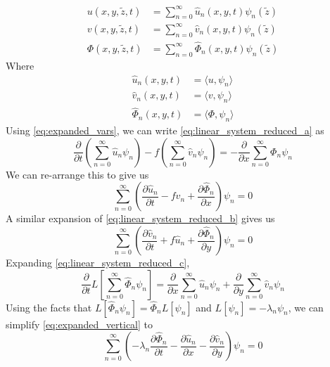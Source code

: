 \documentclass{article}
\numberwithin{equation}{section}
\newcommand{\z}{\tilde{z}}
\begin{document}
\begin{subequations}
  \label{eq:expanded_vars}
  \begin{align}
u(x,y,\z,t) &= \sum_{n=0}^\infty \hat{u}_n(x,y,t)\psi_n({\z}) \\
v(x,y,\z,t) &= \sum_{n=0}^\infty \hat{v}_n(x,y,t)\psi_n({\z}) \\
\Phi(x,y,\z,t) &= \sum_{n=0}^\infty \hat{\Phi}_n(x,y,t)\psi_n({\z})
\end{align}
\end{subequations}
Where 
\begin{subequations}
  \label{eq:expansion_coeffs}
\begin{align}
\hat{u}_n(x,y,t) &= \langle u, \psi_n\rangle \\
\hat{v}_n(x,y,t) &= \langle v, \psi_n\rangle \\
\hat{\Phi}_n(x,y,t) &= \langle \Phi, \psi_n\rangle
\end{align}
\end{subequations}
Using \eqref{eq:expanded_vars}, we can write \eqref{eq:linear_system_reduced_a} as 
\begin{equation}
  \frac{\partial}{\partial t}\left(\sum_{n=0}^\infty \hat{u}_n\psi_n\right) - f\left(\sum_{n=0}^\infty \hat{v}_n\psi_n\right) = -\frac{\partial}{\partial x}\sum_{n=0}^\infty\Phi_n\psi_n
\end{equation}
We can re-arrange this to give us
\begin{equation}
  \label{eq:expanded_u}
  \sum_{n=0}^\infty\left(\frac{\partial \hat{u}_n}{\partial t} - f\hat{v}_n +\frac{\partial\hat{\Phi}_n}{\partial x}\right)\psi_n=0
\end{equation}
A similar expansion of \eqref{eq:linear_system_reduced_b} gives us
\begin{equation}
    \label{eq:expanded_v}
  \sum_{n=0}^\infty\left(\frac{\partial \hat{v}_n}{\partial t} + f\hat{u}_n +\frac{\partial\hat{\Phi}_n}{\partial y}\right)\psi_n=0
\end{equation}
Expanding \eqref{eq:linear_system_reduced_c}, 
\begin{equation}
  \label{eq:expanded_vertical}
  \frac{\partial}{\partial t}L\left[\sum_{n=0}^\infty\hat\Phi_n\psi_n \right] = \frac{\partial}{\partial x}\sum_{n=0}^\infty\hat{u}_n\psi_n + \frac{\partial}{\partial y}\sum_{n=0}^\infty\hat{v}_n\psi_n
\end{equation}
Using the facts that $L[\hat\Phi_n\psi_n]=\hat\Phi_nL[\psi_n]$ and $L[\psi_n]=-\lambda_n\psi_n$, we can simplify \eqref{eq:expanded_vertical} to
\begin{equation}
  \sum_{n=0}^\infty\left(-\lambda_n\frac{\partial\hat\Phi_n}{\partial t}
  -\frac{\partial\hat u_n}{\partial x}
  - \frac{\partial\hat v_n}{\partial y} \right)\psi_n = 0
\end{equation}
\end{document}
